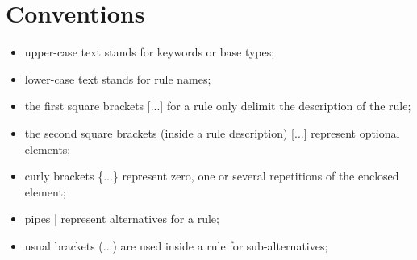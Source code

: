 \chapter{Conventions}
\begin{itemize}
\item upper-case text stands for keywords or base types;
\item lower-case text stands for rule names;
\item the first square brackets [...] for a rule only delimit the
  description of the rule;
\item the second square brackets (inside a rule description) [...]
  represent optional elements;
\item curly brackets \{...\} represent zero, one or several repetitions
  of the enclosed element;
\item pipes | represent alternatives for a rule;
\item usual brackets (...) are used inside a rule for sub-alternatives;
\end{itemize}
